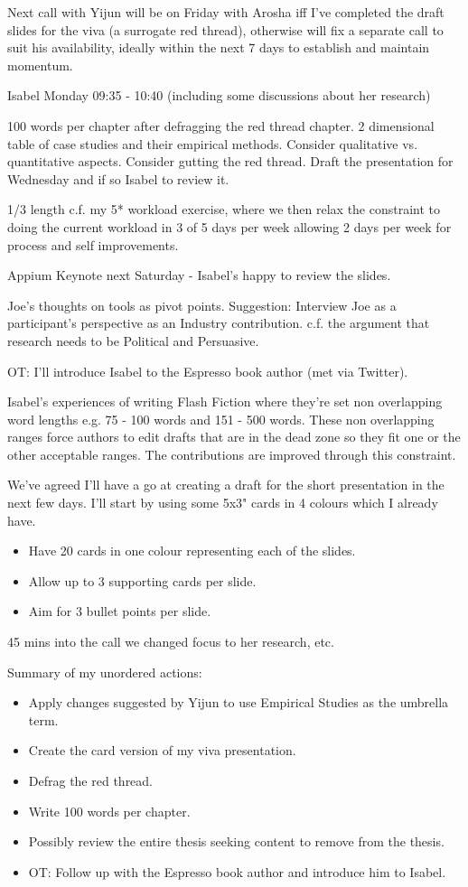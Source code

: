 Next call with Yijun will be on Friday with Arosha iff I've completed the draft slides for the viva (a surrogate red thread), otherwise will fix a separate call to suit his availability, ideally within the next 7 days to establish and maintain momentum.

\hfillrule

Isabel Monday 09:35 - 10:40 (including some discussions about her research)

100 words per chapter after defragging the red thread chapter.
2 dimensional table of case studies and their empirical methods. Consider qualitative vs. quantitative aspects. 
Consider gutting the red thread.
Draft the presentation for Wednesday and if so Isabel to review it.

1/3 length c.f. my 5* workload exercise, where we then relax the constraint to doing the current workload in 3 of 5 days per week allowing 2 days per week for process and self improvements.

Appium Keynote next Saturday - Isabel's happy to review the slides.

Joe's thoughts on tools as pivot points. Suggestion: Interview Joe as a participant's perspective as an Industry contribution.
c.f. the argument that research needs to be Political and Persuasive. 

OT: I'll introduce Isabel to the Espresso book author (met via Twitter).

Isabel's experiences of writing Flash Fiction where they're set non overlapping word lengths e.g. 75 - 100 words and 151 - 500 words. These non overlapping ranges force authors to edit drafts that are in the dead zone so they fit one or the other acceptable ranges. The contributions are improved through this constraint.

We've agreed I'll have a go at creating a draft for the short presentation in the next few days. I'll start by using some 5x3" cards in 4 colours which I already have. 
\begin{itemize}
    \item Have 20 cards in one colour representing each of the slides. 
    \item Allow up to 3 supporting cards per slide.
    \item Aim for 3 bullet points per slide. 
\end{itemize}
45 mins into the call we changed focus to her research, etc.

Summary of my unordered actions:
\begin{itemize}
    \item Apply changes suggested by Yijun to use Empirical Studies as the umbrella term.
    \item Create the card version of my viva presentation.
    \item Defrag the red thread.
    \item Write 100 words per chapter.
    \item Possibly review the entire thesis seeking content to remove from the thesis.
    \item OT: Follow up with the Espresso book author and introduce him to Isabel.
\end{itemize}

\hfillrule


\hfillrule


\hfillrule


\hfillrule


\hfillrule



